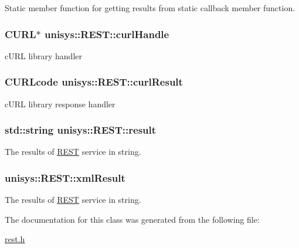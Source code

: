 Static member function for getting results from static callback member function. 

\hypertarget{classunisys_1_1REST_a0883a12f6ff081295982f74bd6d1aa46}{
\subsubsection[{curl\-Handle}]{\setlength{\rightskip}{0pt plus 5cm}C\-U\-R\-L$\ast$ unisys\-::\-R\-E\-S\-T\-::curl\-Handle\hspace{0.3cm}{\ttfamily [protected]}}}\label{classunisys_1_1REST_a0883a12f6ff081295982f74bd6d1aa46}


c\-U\-R\-L library handler 

\hypertarget{classunisys_1_1REST_ab8e5c6e4ee484f86d09ce6caaf6ee08f}{
\subsubsection[{curl\-Result}]{\setlength{\rightskip}{0pt plus 5cm}C\-U\-R\-Lcode unisys\-::\-R\-E\-S\-T\-::curl\-Result\hspace{0.3cm}{\ttfamily [protected]}}}\label{classunisys_1_1REST_ab8e5c6e4ee484f86d09ce6caaf6ee08f}


c\-U\-R\-L library response handler 

\hypertarget{classunisys_1_1REST_a4bb59e07505ee0bcb138fc662d4bcb68}{
\subsubsection[{result}]{\setlength{\rightskip}{0pt plus 5cm}std\-::string unisys\-::\-R\-E\-S\-T\-::result\hspace{0.3cm}{\ttfamily [protected]}}}\label{classunisys_1_1REST_a4bb59e07505ee0bcb138fc662d4bcb68}


The results of \hyperlink{classunisys_1_1REST}{R\-E\-S\-T} service in string. 

\hypertarget{classunisys_1_1REST_a8ad94e0f4cde502eafef44da193bdad0}{
\subsubsection[{xml\-Result}]{ unisys\-::\-R\-E\-S\-T\-::xml\-Result\hspace{0.3cm}{\ttfamily [protected]}}}\label{classunisys_1_1REST_a8ad94e0f4cde502eafef44da193bdad0}


The results of \hyperlink{classunisys_1_1REST}{R\-E\-S\-T} service in string. 



The documentation for this class was generated from the following file\-:\begin{DoxyCompactItemize}
\item 
\hyperlink{rest_8h}{rest.\-h}\end{DoxyCompactItemize}
